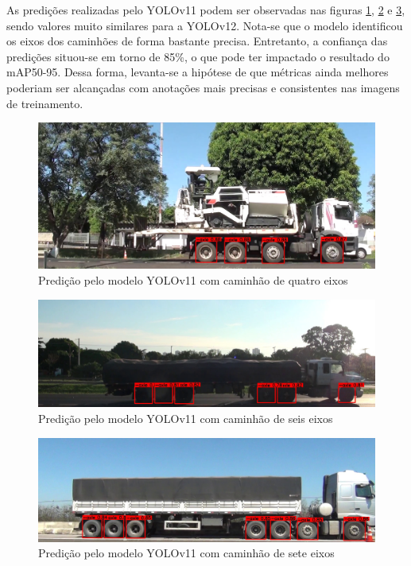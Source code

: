         As predições realizadas pelo YOLOv11 podem ser observadas nas figuras \ref{fig:predicao_yolo_1}, \ref{fig:predicao_yolo_2} e \ref{fig:predicao_yolo_3}, sendo valores muito similares para a YOLOv12. Nota-se que o modelo identificou os eixos dos caminhões de forma bastante precisa. Entretanto, a confiança das predições situou-se em torno de 85\%, o que pode ter impactado o resultado do mAP50-95. Dessa forma, levanta-se a hipótese de que métricas ainda melhores poderiam ser alcançadas com anotações mais precisas e consistentes nas imagens de treinamento.

        \begin{figure} [!htb]
            \centering
            \includegraphics[width=1\linewidth]{Images//yolo_outputs/yolo_output_20170418095402_color-[ROI-1]-94(1).jpg}
            \caption{Predição pelo modelo YOLOv11 com caminhão de quatro eixos}
            \label{fig:predicao_yolo_1}
        \end{figure}

        \begin{figure} [!htb]
            \centering
            \includegraphics[width=1\linewidth]{Images//yolo_outputs/yolo_output_20170418074140-550_color-[ROI-1]-30.jpg}
            \caption{Predição pelo modelo YOLOv11 com caminhão de seis eixos}
            \label{fig:predicao_yolo_2}
        \end{figure}

        \begin{figure} [!htb]
            \centering
            \includegraphics[width=1\linewidth]{Images//yolo_outputs/yolo_output_20160927102749_color-[ROI-1]-1.jpg}
            \caption{Predição pelo modelo YOLOv11 com caminhão de sete eixos}
            \label{fig:predicao_yolo_3}
        \end{figure}
        
